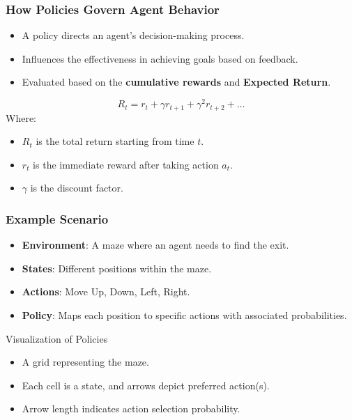 \documentclass[aspectratio=169]{beamer}
\begin{document}
\begin{frame}[fragile]
    \frametitle{How Policies Govern Agent Behavior}
    \begin{itemize}
        \item A policy directs an agent's decision-making process.
        \item Influences the effectiveness in achieving goals based on feedback.
        \item Evaluated based on the \textbf{cumulative rewards} and \textbf{Expected Return}.
    \end{itemize}
    \begin{equation}
        R_t = r_t + \gamma r_{t+1} + \gamma^2 r_{t+2} + \ldots
    \end{equation}
    Where:
    \begin{itemize}
        \item \( R_t \) is the total return starting from time \( t \).
        \item \( r_t \) is the immediate reward after taking action \( a_t \).
        \item \( \gamma \) is the discount factor.
    \end{itemize}
\end{frame}

\begin{frame}[fragile]
    \frametitle{Example Scenario}
    \begin{itemize}
        \item \textbf{Environment}: A maze where an agent needs to find the exit.
        \item \textbf{States}: Different positions within the maze.
        \item \textbf{Actions}: Move Up, Down, Left, Right.
        \item \textbf{Policy}: Maps each position to specific actions with associated probabilities.
    \end{itemize}
    \begin{block}{Visualization of Policies}
        \begin{itemize}
            \item A grid representing the maze. 
            \item Each cell is a state, and arrows depict preferred action(s).
            \item Arrow length indicates action selection probability.
        \end{itemize}
    \end{block}
\end{frame}
\end{document}
